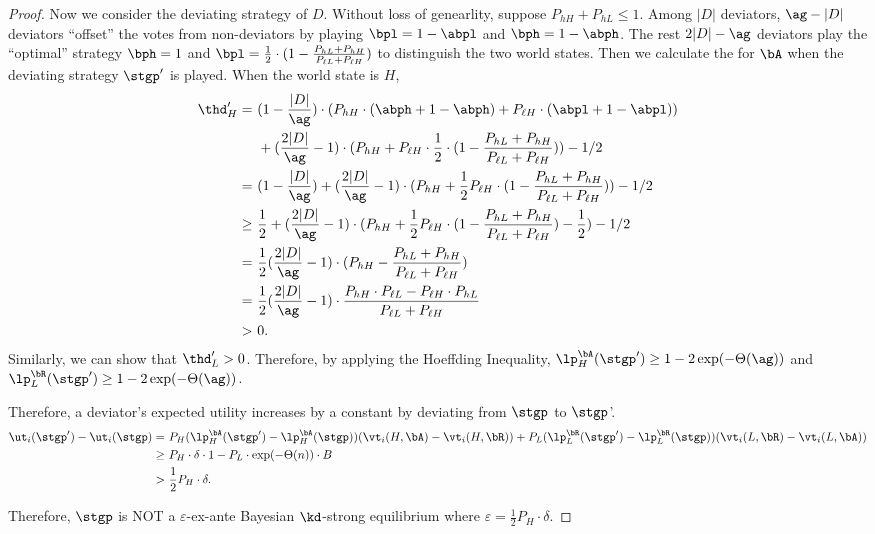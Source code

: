 \begin{proof}
    Now we consider the deviating strategy of $D$. Without loss of genearlity, suppose $P_{hH} + P_{hL} \le 1.$ Among $|D|$ deviators, $\ag - |D|$ deviators ``offset'' the votes from non-deviators by playing $\bpl = 1 - \abpl$ and $\bph = 1 - \abph$. The rest $2|D| - \ag$ deviators play the ``optimal'' strategy $\bph = 1$ and $\bpl = \frac12 \cdot (1 - \frac{P_{hL} + P_{hH}}{P_{\ell L} + P_{\ell H}})$ to distinguish the two world states. Then we calculate the \exshare{} for $\bA$ when the deviating strategy $\stgp'$ is played. When the world state is $H$, 
    \begin{align*}
        \thd_H' =&\ (1 - \frac{|D|}{\ag})\cdot (P_{hH}\cdot (\abph + 1 - \abph) + P_{\ell H}\cdot (\abpl + 1 - \abpl))\\
        &\ + (\frac{2|D|}{\ag} - 1) \cdot (P_{hH} + P_{\ell H}\cdot \frac12 \cdot (1 - \frac{P_{hL} + P_{hH}}{P_{\ell L} + P_{\ell H}})) - 1/2\\
        =&\ (1 - \frac{|D|}{\ag}) + (\frac{2|D|}{\ag} - 1)\cdot(P_{hH} + \frac12 P_{\ell H}\cdot (1 - \frac{P_{hL} + P_{hH}}{P_{\ell L} + P_{\ell H}})) - 1/2\\
        \ge&\ \frac{1}{2} + (\frac{2|D|}{\ag} - 1) \cdot (P_{hH} + \frac12 P_{\ell H}\cdot (1 - \frac{P_{hL} + P_{hH}}{P_{\ell L} + P_{\ell H}}) - \frac12) - 1/2\\
        =&\ \frac12(\frac{2|D|}{\ag} - 1) \cdot (P_{hH} - \frac{P_{hL} + P_{hH}}{P_{\ell L} + P_{\ell H}})\\
        =&\ \frac12(\frac{2|D|}{\ag} - 1)\cdot \frac{P_{hH} \cdot P_{\ell L} - P_{\ell H}\cdot P_{hL}}{P_{\ell L} + P_{\ell H}} \\
        >&\ 0.
    \end{align*}
    Similarly, we can show that $\thd_L' > 0$. Therefore, by applying the Hoeffding Inequality, $\lp_H^{\bA}(\stgp')\ge 1 - 2 \exp(-\Theta(\ag))$ and $\lp_L^{\bR}(\stgp') \ge 1 - 2\exp(-\Theta(\ag))$. 

    Therefore, a deviator's expected utility increases by a constant by deviating from $\stgp$ to $\stgp$'.
    \begin{align*}
        \ut_{i}(\stgp') - \ut_{i}(\stgp) =&\ P_H(\lp_{H}^{\bA}(\stgp') - \lp_{H}^{\bA}(\stgp))(\vt_{i}(H, \bA) - \vt_{i}(H, \bR)) + P_L (\lp_{L}^{\bR}(\stgp') - \lp_{L}^{\bR}(\stgp))(\vt_{i}(L, \bR) - \vt_{i}(L, \bA)) \\
        \ge &\ P_{H}\cdot \delta\cdot 1 - P_{L}\cdot\exp(-\Theta(n)) \cdot B\\
        > &\  \frac12 P_H\cdot \delta.
    \end{align*}

    Therefore, $\stgp$ is NOT a $\varepsilon$-ex-ante Bayesian $\kd$-strong equilibrium where $\varepsilon = \frac12 P_{H}\cdot \delta$. 
\end{proof}

